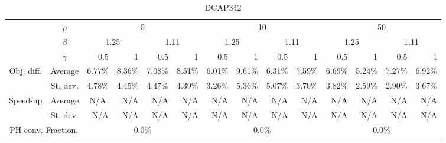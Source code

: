 \documentclass[preprint, 1p, review]{elsarticle}
\begin{document}
 \begin{table}[htbp]
   \centering
   \tiny
     \begin{tabular}{ccrrrrrrrrrrrr}
     \toprule
     \multirow{3}[6]{*}{} & $\rho$ & \multicolumn{4}{c}{5} & \multicolumn{4}{c}{10} & \multicolumn{4}{c}{50} \\
     
        & $\beta$ & \multicolumn{2}{c}{1.25} & \multicolumn{2}{c}{1.11} & \multicolumn{2}{c}{1.25} & \multicolumn{2}{c}{1.11} & \multicolumn{2}{c}{1.25} & \multicolumn{2}{c}{1.11} \\
        & $\gamma$ & 0.5 & 1  & 0.5 & 1  & 0.5 & 1  & 0.5 & 1  & 0.5 & 1  & 0.5 & 1 \\  \midrule
     \multirow{2}[4]{*}{Obj. diff.} & Average & 6.77\% & 8.36\% & 7.08\% & 8.51\% & 6.01\% & 9.61\% & 6.31\% & 7.59\% & 6.69\% & 5.24\% & 7.27\% & 6.92\% \\
        & St. dev. & 4.78\% & 4.45\% & 4.47\% & 4.39\% & 3.26\% & 5.36\% & 5.07\% & 3.70\% & 3.82\% & 2.59\% & 2.90\% & 3.67\% \\
     \multirow{2}[4]{*}{Speed-up} & Average & \multicolumn{1}{c}{N/A} & N/A & N/A & N/A & N/A & N/A & N/A & N/A & N/A & N/A & N/A & N/A \\
        & St. dev. & N/A & N/A & N/A & N/A & N/A & N/A & N/A & N/A & N/A & N/A & N/A & N/A \\
     \multicolumn{2}{c}{PH conv. Fraction.} & \multicolumn{4}{c}{0.0\%} & \multicolumn{4}{c}{0.0\%} & \multicolumn{4}{c}{0.0\%} \\
     \bottomrule
     \end{tabular}%
   \label{tab:App4}%
   \caption{DCAP342}
  \end{table}%
% 
\end{document}

